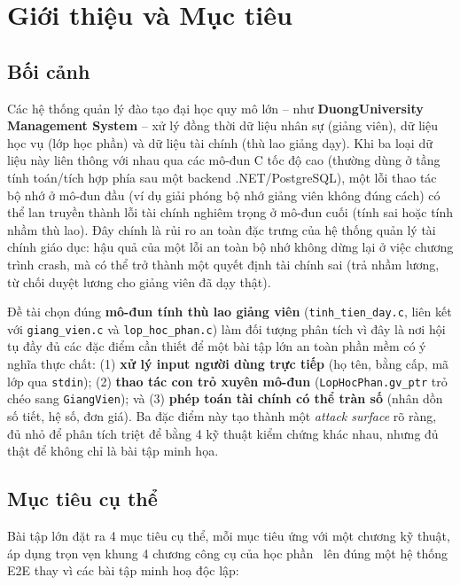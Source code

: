 \section{Giới thiệu và Mục tiêu}
\label{sec:gioithieu}

\subsection{Bối cảnh}

Các hệ thống quản lý đào tạo đại học quy mô lớn -- như \textbf{DuongUniversity Management System} -- xử lý đồng thời dữ liệu nhân sự (giảng viên), dữ liệu học vụ (lớp học phần) và dữ liệu tài chính (thù lao giảng dạy). Khi ba loại dữ liệu này liên thông với nhau qua các mô-đun C tốc độ cao (thường dùng ở tầng tính toán/tích hợp phía sau một backend .NET/PostgreSQL), một lỗi thao tác bộ nhớ ở mô-đun đầu (ví dụ giải phóng bộ nhớ giảng viên không đúng cách) có thể lan truyền thành lỗi tài chính nghiêm trọng ở mô-đun cuối (tính sai hoặc tính nhầm thù lao). Đây chính là rủi ro an toàn đặc trưng của hệ thống quản lý tài chính giáo dục: hậu quả của một lỗi an toàn bộ nhớ không dừng lại ở việc chương trình crash, mà có thể trở thành một quyết định tài chính sai (trả nhầm lương, từ chối duyệt lương cho giảng viên đã dạy thật).

Đề tài chọn đúng \textbf{mô-đun tính thù lao giảng viên} (\texttt{tinh\_tien\_day.c}, liên kết với \texttt{giang\_vien.c} và \texttt{lop\_hoc\_phan.c}) làm đối tượng phân tích vì đây là nơi hội tụ đầy đủ các đặc điểm cần thiết để một bài tập lớn an toàn phần mềm có ý nghĩa thực chất: (1) \textbf{xử lý input người dùng trực tiếp} (họ tên, bằng cấp, mã lớp qua \texttt{stdin}); (2) \textbf{thao tác con trỏ xuyên mô-đun} (\texttt{LopHocPhan.gv\_ptr} trỏ chéo sang \texttt{GiangVien}); và (3) \textbf{phép toán tài chính có thể tràn số} (nhân dồn số tiết, hệ số, đơn giá). Ba đặc điểm này tạo thành một \emph{attack surface} rõ ràng, đủ nhỏ để phân tích triệt để bằng 4 kỹ thuật kiểm chứng khác nhau, nhưng đủ thật để không chỉ là bài tập minh họa.

\subsection{Mục tiêu cụ thể}

Bài tập lớn đặt ra 4 mục tiêu cụ thể, mỗi mục tiêu ứng với một chương kỹ thuật, áp dụng trọn vẹn khung 4 chương công cụ của học phần~\cite{softsectoolkit2026} lên đúng một hệ thống E2E thay vì các bài tập minh hoạ độc lập:

